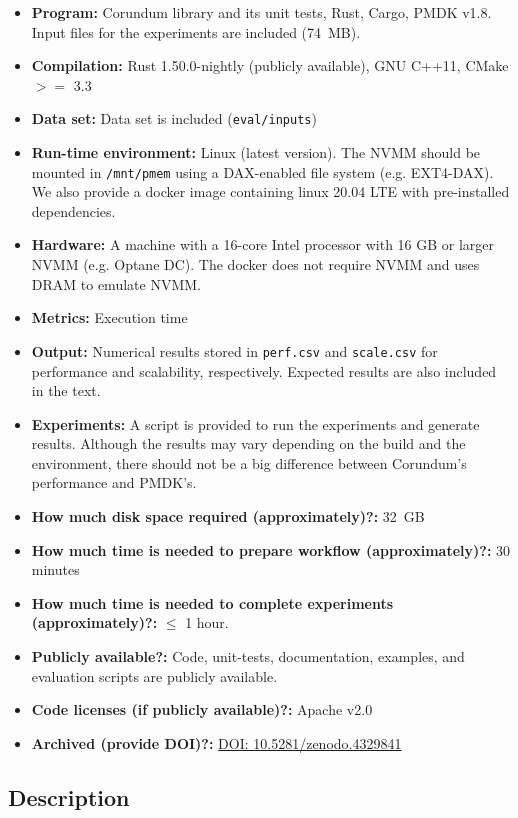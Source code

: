 {\small
\begin{itemize}
  \item {\bf Program: } Corundum library and its unit tests, Rust, Cargo, PMDK v1.8. Input files for the experiments are included (74~MB).
  \item {\bf Compilation: } Rust 1.50.0-nightly (publicly available), GNU C++11, CMake $>=$ 3.3 
  \item {\bf Data set: } Data set is included (\verb+eval/inputs+)
  \item {\bf Run-time environment: } Linux (latest version). The NVMM should be mounted in \verb+/mnt/pmem+ using a DAX-enabled file system (e.g. EXT4-DAX). We also provide a docker image containing linux 20.04 LTE with pre-installed dependencies.
  \item {\bf Hardware: } A machine with a 16-core Intel processor with 16 GB or larger NVMM (e.g. Optane DC). The docker does not require NVMM and uses DRAM to emulate NVMM. 
  \item {\bf Metrics: } Execution time
  \item {\bf Output: } Numerical results stored in \verb+perf.csv+ and \verb+scale.csv+ for performance and scalability, respectively. Expected results are also included in the text.
  \item {\bf Experiments: } A script is provided to run the experiments and generate results. Although the results may vary depending on the build and the environment, there should not be a big difference between Corundum's performance and PMDK's.
  \item {\bf How much disk space required (approximately)?: } 32~GB
  \item {\bf How much time is needed to prepare workflow (approximately)?: } 30 minutes
  \item {\bf How much time is needed to complete experiments (approximately)?: } $\leq$ 1 hour.
  \item {\bf Publicly available?: } Code, unit-tests, documentation, examples, and evaluation scripts are publicly available.
  \item {\bf Code licenses (if publicly available)?: } Apache v2.0
  \item {\bf Archived (provide DOI)?: } \href{https://zenodo.org/record/4329841}{DOI: 10.5281/zenodo.4329841}
\end{itemize}

\subsection{Description}

}
